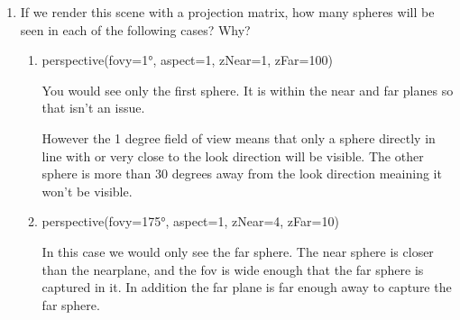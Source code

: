 \documentclass{article}
\begin{document}
\begin{enumerate}
\begin{enumerate}
\begin{mdframed}
                        For this scenario a near plane of 1 would
                        make sense since the near sphere is 2 units
                        from the eye, and has a radius of 1.

                        The far plane would need to be set
                        to 6, since it is 5 units away long
                        the look direction and 1 unit in radius.

                        We measure distance along the look direction
                        since this is what is used to define the near
                        and far planes rather than the euclidean distance
                        between the points.
                    \end{mdframed}
                    \break

                \item If we render this scene with a projection matrix, how many spheres will be seen
                    in each of the following cases? Why?
                    \begin{enumerate}
                        \item perspective(fovy=1°, aspect=1, zNear=1, zFar=100)
                            \begin{mdframed}
                                You would see only the first sphere. It is within
                                the near and far planes so that isn't an issue.

                                However the 1 degree field of view means that
                                only a sphere directly in line with or very close
                                to the look direction will be visible. The other
                                sphere is more than 30 degrees away from the look
                                direction meaining it won't be visible.
                            \end{mdframed}

                        \item perspective(fovy=175°, aspect=1, zNear=4, zFar=10)
                            \begin{mdframed}
                                In this case we would only see the far sphere.
                                The near sphere is closer than the nearplane,
                                and the fov is wide enough that the far sphere is
                                captured in it. In addition the
                                far plane is far enough away to capture the 
                                far sphere.
                            \end{mdframed}


\end{enumerate}
\end{enumerate}
\end{enumerate}
\end{document}

